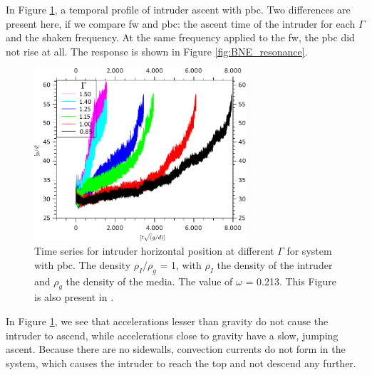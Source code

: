     In Figure \ref{fig:BNE30000_Contorno}, a temporal profile of intruder ascent with pbc. Two differences are present here, if we compare fw and pbc: the ascent time of the intruder for each $\Gamma$ and the shaken frequency. At the same frequency applied to the fw, the pbc did not rise at all. The response is shown in Figure \ref{fig:BNE_resonance}.

\begin{figure}[H]
    \centering
    \includegraphics[width=0.7\textwidth]{04-figuras/BNE30000Contorno.pdf}
    \caption[BNE with periodic boundary: time series.]{Time series for intruder horizontal position at different $\Gamma$ for system with pbc. The density $\rho_I/\rho_g$ = 1, with $\rho_I$ the density of the intruder and $\rho_g$ the density of the media. The value of $\omega$ = 0.213. This Figure is also present in \cite{Large-deviation_quantification_of_boundary_conditions_on_the_Brazil_nut_effect}.}
    \label{fig:BNE30000_Contorno}
\end{figure}

    In Figure \ref{fig:BNE30000_Contorno}, we see that accelerations lesser than gravity do not cause the intruder to ascend, while accelerations close to gravity have a slow, jumping ascent. Because there are no sidewalls, convection currents do not form in the system, which causes the intruder to reach the top and not descend any further. 

